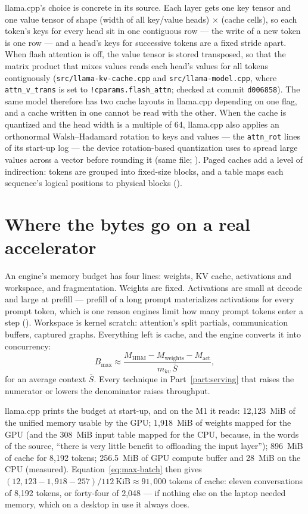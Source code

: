llama.cpp's choice is concrete in its source. Each layer gets one key tensor
and one value tensor of shape (width of all key/value heads) $\times$ (cache
cells), so each token's keys for every head sit in one contiguous row --- the
write of a new token is one row --- and a head's keys for successive tokens are
a fixed stride apart. When flash attention is off, the value tensor is stored
transposed, so that the matrix product that mixes values reads each head's
values for all tokens contiguously (\texttt{src/llama-kv-cache.cpp} and
\texttt{src/llama-model.cpp}, where \texttt{attn\_v\_trans} is set to
\texttt{!cparams.flash\_attn}; checked at commit \texttt{d006858}). The same
model therefore has two cache layouts in llama.cpp depending on one flag, and a
cache written in one cannot be read with the other. When the cache is quantized
and the head width is a multiple of 64, llama.cpp also applies an orthonormal
Walsh--Hadamard rotation to keys and values --- the \texttt{attn\_rot} lines of
its start-up log --- the device rotation-based quantization uses to spread large
values across a vector before rounding it (same file; ). Paged caches add a
level of indirection: tokens are grouped into fixed-size blocks, and a table
maps each sequence's logical positions to physical blocks ().

\section{Where the bytes go on a real accelerator}

An engine's memory budget has four lines: weights, KV cache, activations and
workspace, and fragmentation. Weights are fixed. Activations are small at
decode and large at prefill --- prefill of a long prompt materializes
activations for every prompt token, which is one reason engines limit how many
prompt tokens enter a step (). Workspace is kernel
scratch: attention's split partials, communication buffers, captured graphs.
Everything left is cache, and the engine converts it into concurrency:
\begin{equation}
B_{\max} \approx \frac{M_{\text{HBM}} - M_{\text{weights}} - M_{\text{act}}}
{m_{kv}\,\bar{S}},
\label{eq:max-batch}
\end{equation}
for an average context $\bar{S}$. Every technique in Part~\ref{part:serving}
that raises the numerator or lowers the denominator raises throughput.

llama.cpp prints the budget at start-up, and on the M1 it reads: 12,123~MiB of
the unified memory usable by the GPU; 1,918~MiB of weights mapped for the GPU
(and the 308~MiB input table mapped for the CPU, because, in the words of the
source, ``there is very little benefit to offloading the input layer''); 896~MiB
of cache for 8,192 tokens; 256.5~MiB of GPU compute buffer and 28~MiB on the CPU
(measured). Equation~\eqref{eq:max-batch} then gives
$(12{,}123 - 1{,}918 - 257) / 112~\text{KiB} \approx 91{,}000$ tokens of cache:
eleven conversations of 8,192 tokens, or forty-four of 2,048 --- if nothing else
on the laptop needed memory, which on a desktop in use it always does.

